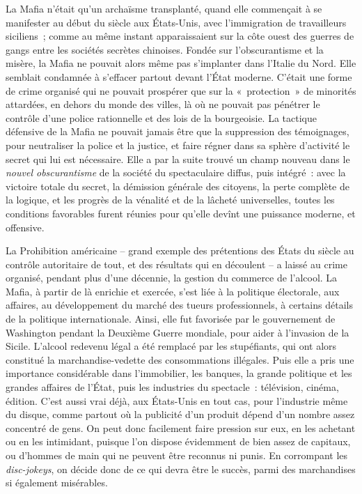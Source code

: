 \documentclass[french,twoside]{book} %
\begin{document}
\noindent La Mafia n’était qu’un archaïsme transplanté, quand elle commençait à se manifester au début du siècle aux États-Unis, avec l’immigration de travailleurs siciliens ; comme au même instant apparaissaient sur la côte ouest des guerres de gangs entre les sociétés secrètes chinoises. Fondée sur l’obscurantisme et la misère, la Mafia ne pouvait alors même pas s’implanter dans l’Italie du Nord. Elle semblait condamnée à s’effacer partout devant l’État moderne. C’était une forme de crime organisé qui ne pouvait prospérer que sur la « protection » de minorités attardées, en dehors du monde des villes, là où ne pouvait pas pénétrer le contrôle d’une police rationnelle et des lois de la bourgeoisie. La tactique défensive de la Mafia ne pouvait jamais être que la suppression des témoignages, pour neutraliser la police et la justice, et faire régner dans sa sphère d’activité le secret qui lui est nécessaire. Elle a par la suite trouvé un champ nouveau dans le \emph{nouvel obscurantisme} de la société du spectaculaire diffus, puis intégré : avec la victoire totale du secret, la démission générale des citoyens, la perte complète de la logique, et les progrès de la vénalité et de la lâcheté universelles, toutes les conditions favorables furent réunies pour qu’elle devînt une puissance moderne, et offensive.\par
La Prohibition américaine – grand exemple des prétentions des États du siècle au contrôle autoritaire de tout, et des résultats qui en découlent – a laissé au crime organisé, pendant plus d’une décennie, la gestion du commerce de l’alcool. La Mafia, à partir de là enrichie et exercée, s’est liée à la politique électorale, aux affaires, au développement du marché des tueurs professionnels, à certains détails de la politique internationale. Ainsi, elle fut favorisée par le gouvernement de Washington pendant la Deuxième Guerre mondiale, pour aider à l’invasion de la Sicile. L’alcool redevenu légal a été remplacé par les stupéfiants, qui ont alors constitué la marchandise-vedette des consommations illégales. Puis elle a pris une importance considérable dans l’immobilier, les banques, la grande politique et les grandes affaires de l’État, puis les industries du spectacle : télévision, cinéma, édition. C’est aussi vrai déjà, aux États-Unis en tout cas, pour l’industrie même du disque, comme partout où la publicité d’un produit dépend d’un nombre assez concentré de gens. On peut donc facilement faire pression sur eux, en les achetant ou en les intimidant, puisque l’on dispose évidemment de bien assez de capitaux, ou d’hommes de main qui ne peuvent être reconnus ni punis. En corrompant les \emph{disc-jokeys}, on décide donc de ce qui devra être le succès, parmi des marchandises si également misérables.\par
\end{document}
